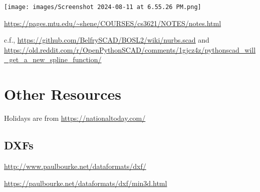 \documentclass{ltxdoc}
\begin{document}
\noindent\texttt{[image: images/Screenshot 2024-08-11 at 6.55.26 PM.png]}

\url{https://pages.mtu.edu/~shene/COURSES/cs3621/NOTES/notes.html}

c.f., \url{https://github.com/BelfrySCAD/BOSL2/wiki/nurbs.scad} and \url{https://old.reddit.com/r/OpenPythonSCAD/comments/1gjcz4z/pythonscad_will_get_a_new_spline_function/}

\section{Other Resources}
 
Holidays are from \url{https://nationaltoday.com/}

\subsection*{DXFs}

\url{http://www.paulbourke.net/dataformats/dxf/}

\noindent\url{https://paulbourke.net/dataformats/dxf/min3d.html}


 


\end{document}
